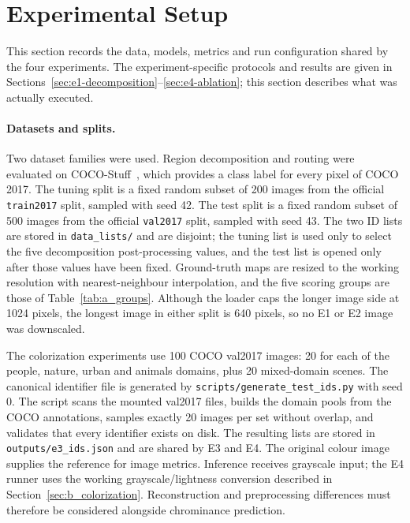 \documentclass{FastFyp}
\begin{document}
\section{Experimental Setup}
\label{sec:experimental-setup}

This section records the data, models, metrics and run configuration shared by
the four experiments. The experiment-specific protocols and results are given
in Sections~\ref{sec:e1-decomposition}--\ref{sec:e4-ablation}; this section
describes what was actually executed.

\paragraph{Datasets and splits.}
Two dataset families were used. Region decomposition and routing were evaluated
on COCO-Stuff~\cite{caesar2018cocostuff}, which provides a class label for every
pixel of COCO 2017. The tuning split is a fixed random subset of 200 images from
the official \texttt{train2017} split, sampled with seed 42. The test split is a
fixed random subset of 500 images from the official \texttt{val2017} split,
sampled with seed 43. The two ID lists are stored in \texttt{data\_lists/} and
are disjoint; the tuning list is used only to select the five decomposition
post-processing values, and the test list is opened only after those values have
been fixed. Ground-truth maps are resized to the working resolution with
nearest-neighbour interpolation, and the five scoring groups are those of
Table~\ref{tab:a_groups}. Although the loader caps the longer image side at
1024 pixels, the longest image in either split is 640 pixels, so no E1 or E2
image was downscaled.

The colorization experiments use 100 COCO val2017 images: 20 for each of the
people, nature, urban and animals domains, plus 20 mixed-domain scenes. The
canonical identifier file is generated by \texttt{scripts/generate\_test\_ids.py}
with seed 0. The script scans the mounted val2017 files, builds the domain pools
from the COCO annotations, samples exactly 20 images per set without overlap,
and validates that every identifier exists on disk. The resulting lists are
stored in \texttt{outputs/e3\_ids.json} and are shared by E3 and E4. The original colour image supplies the reference for image metrics. Inference receives grayscale input; the E4 runner uses the working grayscale/lightness conversion described in Section~\ref{sec:b_colorization}. Reconstruction and preprocessing differences must therefore be considered alongside chrominance prediction.
\end{document}
